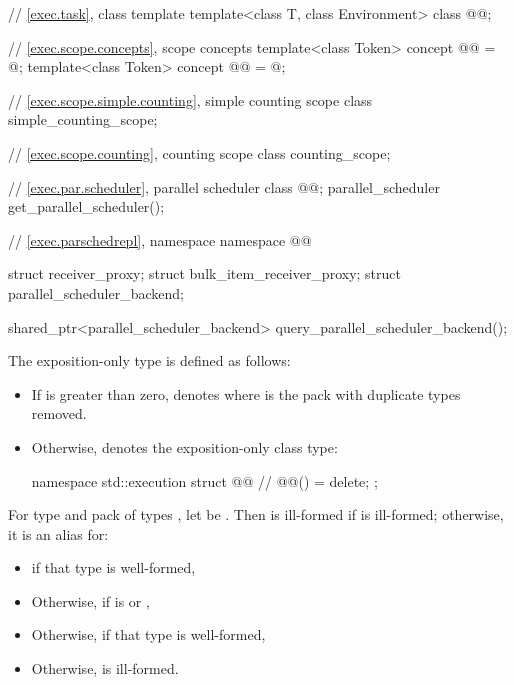 \begin{codeblock}
{  // \ref{exec.task}, class template 
  template<class T, class Environment>
    class @@;

  // \ref{exec.scope.concepts}, scope concepts
  template<class Token>
    concept @@ = @\seebelow@;
  template<class Token>
    concept @@ = @\seebelow@;

  // \ref{exec.scope.simple.counting}, simple counting scope
  class simple_counting_scope;

  // \ref{exec.scope.counting}, counting scope
  class counting_scope;

  // \ref{exec.par.scheduler}, parallel scheduler
  class @@;
  parallel_scheduler get_parallel_scheduler();

  // \ref{exec.parschedrepl}, namespace 
  namespace @@ {
    struct receiver_proxy;
    struct bulk_item_receiver_proxy;
    struct parallel_scheduler_backend;

    shared_ptr<parallel_scheduler_backend> query_parallel_scheduler_backend();
  }
}
\end{codeblock}

\pnum
The exposition-only type 
is defined as follows:
\begin{itemize}
\item
If  is greater than zero,
 denotes 
where  is the pack 
with duplicate types removed.
\item
Otherwise,  denotes
the exposition-only class type:
\begin{codeblock}
namespace std::execution {
  struct @@ {        // \expos
    @@() = delete;
  };
}
\end{codeblock}
\end{itemize}

\pnum
For type  and pack of types ,
let  be .
Then  is ill-formed
if  is ill-formed;
otherwise, it is an alias for:
\begin{itemize}
\item
{}
if that type is well-formed,
\item
Otherwise, 
if  is
 or ,
\item
Otherwise, 
if that\linebreak{} type is well-formed,
\item
Otherwise,  is ill-formed.
\end{itemize}

